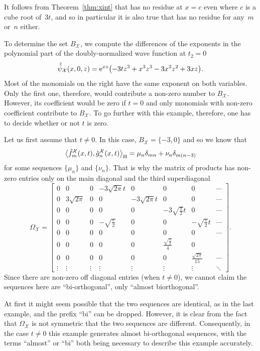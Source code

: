 \documentclass[pdftex]{sigma}
\numberwithin{equation}{section}
\theoremstyle{definition}
\def\X{\mathcal{X}}
\def\ff{\hat f}
\def\gg{\hat g}
\begin{document}
It follows from Theorem~\ref{thm:xint} that
\smash{$\hat\psi_{\X^\flat}\bigl(x,-\tfrac{1}{2},w\bigr) \hat\psi_{\X}\bigl(x,-\tfrac{1}{2},z\bigr) {\rm e}^{-x^2/2}$} has no
residue at $x=c$ even where $c$ is a cube root of~$3t$, and so in
particular it is also true that \smash{$\ff_m^{\X}(x,t)\gg_n^{\X}(x,t){\rm e}^{-x^2/2}$}
has no residue for any~$m$ or~$n$ either.

To determine the set $B_{\X}$, we compute the differences of the
exponents in the polynomial part of the doubly-normalized wave
function at $t_2=0$
\[
\hat{\hat\psi}_{\X}(x,0,z)={\rm e}^{xz}\bigl(-3 t z^3+x^3 z^3-3 x^2 z^2+3 x z\bigr).
\]
Most of the monomials on the right have the same exponent on both
variables. Only the first one, therefore, would contribute a non-zero
number to $B_{\X}$. However, its coefficient would be zero if $t=0$
and only monomials with non-zero coefficient contribute to $B_{\X}$.
To go further with this example, therefore, one has to decide whether
or not $t$ is zero.


Let us first assume that $t\not=0$.
 In this case, $B_{\X}=\{-3,0\}$ and so we know that
 \[
 \big\langle
 \ff_{m}^{\X}(x,t),\gg_n^{\X}(x,t)\big\rangle_{\rm H}=\mu_n\delta_{mn}+\nu_n\delta_{m(n-3)}
 \]
 for some sequences $\{\mu_n\}$ and $\{\nu_n\}$.
 That is why the matrix of products has non-zero
 entries only on the main diagonal and the third superdiagonal{\samepage
\[
 \Omega_{\X}=\left[\begin{matrix}
0 & 0 & 0 & -3 \sqrt{2 \pi }
 t & 0 & 0 & 0 &\cdots\\
 0 & 3 \sqrt{2 \pi } & 0 & 0 &
 -3 \sqrt{2 \pi } t & 0 & 0
&\cdots \\
 0 & 0 & 0 & 0 & 0 & -3
 \sqrt{\frac{\pi }{2}} t & 0
&\cdots \\
 0 & 0 & 0 & -\sqrt{\frac{\pi
 }{2}} & 0 & 0 &
 -\sqrt{\frac{\pi }{2}} t &\cdots\\
 0 & 0 & 0 & 0 & 0 & 0 & 0 &\cdots\\
 0 & 0 & 0 & 0 & 0 &
 \frac{\sqrt{\frac{\pi
 }{2}}}{4} & 0 \\
 0 & 0 & 0 & 0 & 0 & 0 &
 \frac{\sqrt{2 \pi }}{15} &\cdots\\
\vdots& \vdots& \vdots& \vdots& \vdots& \vdots& \vdots&\ddots
 \end{matrix}\right].
\]
Since there are non-zero off diagonal entries (when
$t\not=0$), we cannot claim the sequences here are ``bi-orthogonal'',
only ``almost biorthogonal''.}


At first it might seem possible that the two sequences are identical, as in the last example, and
the prefix ``bi'' can be dropped.
However, it is clear from the fact that $\Omega_{\X}$
is not symmetric that the two sequences are different. Consequently,
in the case $t\not=0$ this example generates almost bi-orthogonal
sequences, with the terms ``almost'' or ``bi'' both being necessary to
describe this example accurately.
\end{document}
